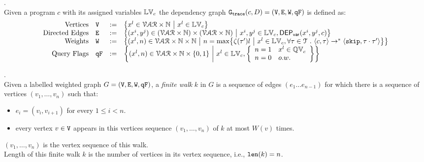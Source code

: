 \begin{defn}.
\\
Given a program ${c}$ with its assigned variables $\mathbb{LV}_c$ 
the dependency graph $\mathtt{G_{trace}}({c}, D) = (\mathtt{V}, \mathtt{E}, \mathtt{W}, \mathtt{qF})$ is defined as:
%
\[
\begin{array}{rlcl}
  \text{Vertices} &
  \vertxs & := & \left\{ 
  x^l \in \mathcal{VAR} \times \mathbb{N} 
  ~ \middle\vert ~ x^l \in \lvar_{c}
  \right\}
  \\
  \text{Directed Edges} &
  \edges & := & 
  \left\{ 
  (x^i, y^j) \in (\mathcal{VAR} \times \mathbb{N}) \times (\mathcal{VAR} \times \mathbb{N})
  ~ \middle\vert ~
  x^i, y^j \in \lvar_{{c}}, \vardep(x^i, y^j, c)
  
  \right\}
  \\
  \text{Weights} &
  \weights & := & 
  \left\{ 
  (x^l, n) \in \mathcal{VAR} \times \mathbb{N} \times \mathbb{N}
  ~ \middle\vert ~ 
  n = \max \left\{ \vcounter(\vtrace') l ~ \middle\vert ~ x^l \in \lvar_{c},
  \forall \vtrace \in \mathcal{T} \st \config{{c}, \trace} \to^{*} \config{\eskip, \trace\cdot\vtrace'} 
   \right\}
  \right\}
  \\
  \text{Query Flags} &
  \qflag & := & 
  \left\{(x^l, n)  \in \mathcal{VAR} \times \mathbb{N}  \times \{0, 1\} 
  ~ \middle\vert ~
   x^l \in \lvar_{c},
   \left\{
  \begin{array}{ll}
  n = 1 & x^l \in \qvar_{c} \\ 
  n = 0 & o.w.
  \end{array}
  \right\}
  \right\}
\end{array}
\]
\end{defn}
%
%
\begin{defn}.
\label{def:finitewalk}
\\
Given a labelled weighted graph $G = (\mathtt{V}, \mathtt{E}, \mathtt{W}, \mathtt{qF})$, a \emph{finite walk} $k$ in $G$ is a sequence of edges $(e_1 \ldots e_{n - 1})$ 
for which there is a sequence of vertices $(v_1, \ldots, v_{n})$ such that:
\begin{itemize}
    \item $e_i = (v_{i},v_{i + 1})$ for every $1 \leq i < n$.
    \item every vertex $v \in \mathtt{V}$ appears in this vertices sequence $(v_1, \ldots, v_{n})$ of $k$ at most $W(v)$ times.  
\end{itemize}
$(v_1, \ldots, v_{n})$ is the vertex sequence of this walk.
\\
%
Length of this finite walk $k$ is the number of vertices in its vertex sequence, i.e., $\mathtt{len}(k) = n$.
\end{defn}
